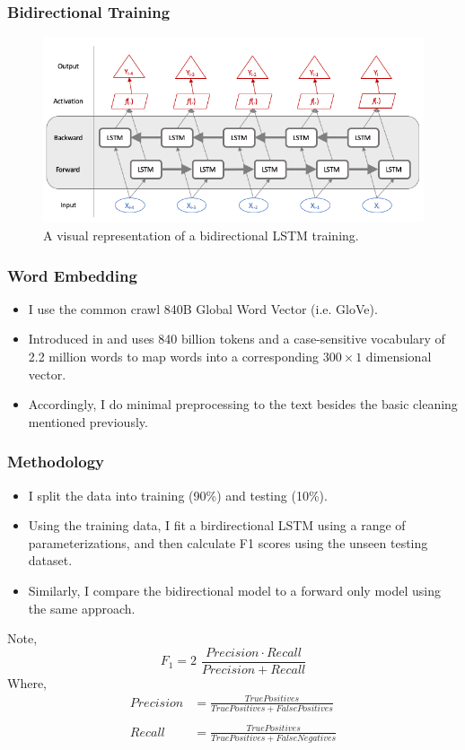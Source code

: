 \documentclass{beamer}
\begin{document}
    \begin{frame}
    	\frametitle{Bidirectional Training}
    	\begin{figure}[H]
    		\includegraphics[width=\textwidth]{figures/images/bidirectional-net.png}
    		\caption{A visual representation of a bidirectional LSTM training.}
    	\end{figure}
    \end{frame}

    \begin{frame}
    	\frametitle{Word Embedding}
    	\begin{itemize}
    		\item I use the common crawl 840B Global Word Vector (i.e. GloVe).
    		\item Introduced in \citet{pennington2014glove} and uses 840 billion tokens and a case-sensitive vocabulary of 2.2 million words to map words into a corresponding $300 \times 1$ dimensional vector. 
    		\item Accordingly, I do minimal preprocessing to the text besides the basic cleaning mentioned previously. 
    	\end{itemize}
    \end{frame}

    \begin{frame}
    	\frametitle{Methodology}
    	\begin{itemize}
    		\item I split the data into training (90\%) and testing (10\%). 
    		\item Using the training data, I fit a birdirectional LSTM using a range of parameterizations, and then calculate F1 scores using the unseen testing dataset. 
    		\item Similarly, I compare the bidirectional model to a forward only model using the same approach. 
    	\end{itemize}
        Note, 
        \begin{equation*}
        F_1 =  2 \,\, \frac{Precision \cdot Recall}{Precision + Recall}
        \end{equation*}
        Where, 
        \begin{align*}
        Precision &= \frac{True Positives}{True Positives + False Positives}\\ \\
        Recall &= \frac{True Positives}{True Positives + False Negatives}
        \end{align*}
    \end{frame}
\end{document}
